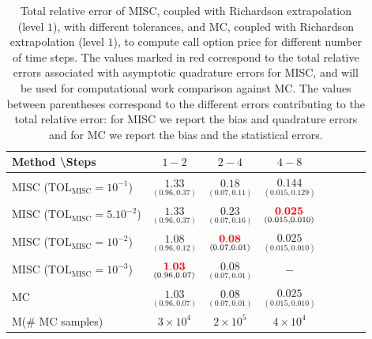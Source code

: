 

\begin{table}[h!]
	\centering
	\begin{tabular}{l*{6}{c}r}
		Method \textbackslash  Steps            & $1-2$ & $2-4$ & $4-8$  \\
		\hline
		MISC ($\text{TOL}_{\text{MISC}}=10^{-1}$)  & $\underset{(0.96,0.37)}{\mathbf{  1.33}}$ & $\underset{(0.07,0.11)}{\mathbf{0.18}}$ & $\underset{(0.015,0.129)}{\mathbf{0.144}}$   \\
		MISC ($\text{TOL}_{\text{MISC}}=5.10^{-2}$)  & $\underset{(0.96,0.37)}{\mathbf{  1.33}}$ & $\underset{(0.07,0.16)}{\mathbf{ 0.23}}$ & $\underset{(0.015,0.010)}{\mathbf{  {\color{red}0.025}}}$   \\
		MISC ($\text{TOL}_{\text{MISC}}=10^{-2}$)  & $\underset{(0.96,0.12)}{\mathbf{   1.08
		}}$ & $\underset{(0.07,0.01)}{\mathbf{    {\color{red}0.08}}}$ & $\underset{(0.015,0.010)}{\mathbf{ 0.025}}$  \\
		MISC ($\text{TOL}_{\text{MISC}}=10^{-3}$)  & $\underset{(0.96,0.07)}{\mathbf{ {\color{red}  1.03}}}$ & $\underset{(0.07,0.01)}{\mathbf{    0.08}}$ & $\mathbf{-}$  \\
		

		\hline
		
		MC &$\underset{(0.96,0.07)}{\mathbf{1.03}}$  & $\underset{(0.07,0.01)}{\mathbf{0.08}}$ & $\underset{(0.015,0.010)}{\mathbf{0.025}}$  \\
		M(\# MC samples) & $3 \times 10^4$  & $2 \times 10^5$ & $4 \times 10^4$  \\

		\hline
	\end{tabular}
	\caption{Total relative error of MISC, coupled with Richardson extrapolation (level $1$), with different tolerances,  and MC, coupled with Richardson extrapolation (level $1$), to compute call option price  for different number of time steps. The values marked in red correspond to the total relative errors associated with  asymptotic quadrature errors for MISC, and will be used for computational work comparison against MC. The values between parentheses correspond to the different errors contributing to the total relative error: for MISC we report the bias and quadrature errors and for MC we report the bias and the statistical errors.}
	\label{Total  error of MISC and MC to compute Call option price of the different tolerances for different number of time steps. Case set $2$ parameters, with Richardson extrapolation(level $1$). The numbers between parentheses are the corresponding absolute errors,relative}
\end{table}
\FloatBarrier


